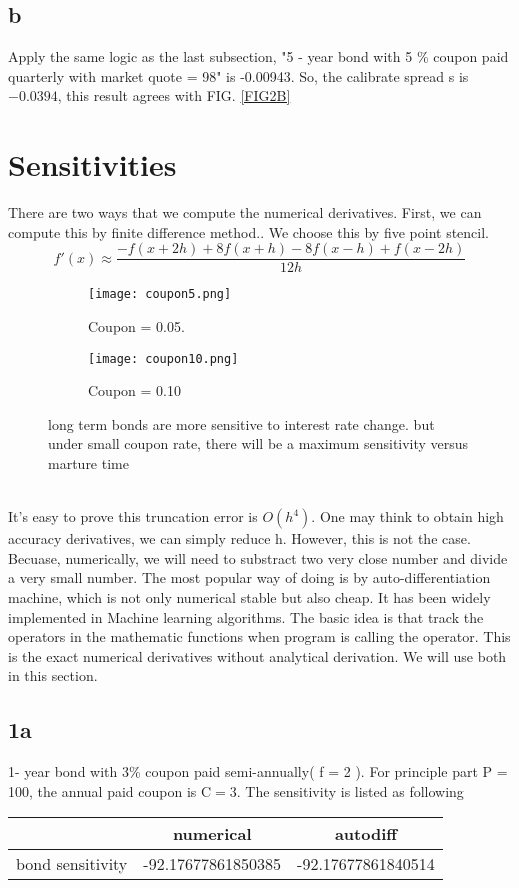 \documentclass[a4paper,11pt]{article} %
\begin{document}
\subsection{b}
Apply the same logic as the last subsection, "5 - year bond with 5 \% coupon paid quarterly with market quote = 98" is -0.00943. So, the calibrate spread s is $-0.0394$, this result agrees with FIG. \ref{FIG2B}
\section{Sensitivities}
There are two ways that we compute the numerical derivatives. First, we can compute this by finite difference method.\cite{zingg1997review,rouabah2012gnss, enwiki:1092596846}. We choose this by five point stencil.
\begin{equation}
	f'(x) \approx \frac{-f(x + 2h) + 8f(x+h) -8f(x -h) + f(x - 2h)}{12h}
\end{equation}
\begin{figure}
	\begin{subfigure}{0.42\textwidth}
	\texttt{[image: coupon5.png]}
	\caption{Coupon = 0.05.}
	\label{section3bc5}
\end{subfigure}
\hfill
\begin{subfigure}{0.45\textwidth}
	\texttt{[image: coupon10.png]}
	\caption{Coupon = 0.10}
	\label{section3bc10}
\end{subfigure}
	\caption{ long term bonds are more sensitive to interest rate change. but under small coupon rate, there will be a maximum sensitivity versus marture time}
	\label{FIG4}
\end{figure}\\
It's easy to prove this truncation error is $O(h^4)$. One may think to obtain high accuracy derivatives, we can simply reduce  h. However, this is not the case. Becuase, numerically, we will need to substract two very close number and divide a very small number. The most popular way of doing  is by auto-differentiation machine, which is not only numerical stable but also cheap. It has been widely implemented in Machine learning algorithms.\cite{maclaurin2016modeling, bolte2020mathematical,baydin2014automatic} The basic idea is that track the operators in the mathematic functions when program is calling the operator. This is the exact numerical derivatives without analytical derivation. We will use both in this section.
\subsection{1a}
1- year bond with 3\% coupon paid semi-annually( f = 2 ). For principle part P = 100, the annual paid coupon is $\mathrm{C = 3}$. The sensitivity is listed as following
\begin{center}
	\begin{tabular}{ |c|c|c| } 
		\hline
		   & numerical& autodiff \\ 
		\hline
		bond sensitivity & -92.17677861850385  & -92.17677861840514 \\ 
		\hline
	\end{tabular}
\end{center}
\end{document}
